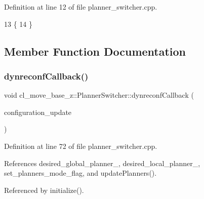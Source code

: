 Definition at line 12 of file planner\+\_\+switcher.\+cpp.


\begin{DoxyCode}
13 \{
14 \}
\end{DoxyCode}


\subsection{Member Function Documentation}
\mbox{\label{classcl__move__base__z_1_1PlannerSwitcher_ad9371bd8d62600ef874e8914c3ec177b}} 
\subsubsection{\texorpdfstring{dynreconf\+Callback()}{dynreconfCallback()}}
{\footnotesize\ttfamily void cl\+\_\+move\+\_\+base\+\_\+z\+::\+Planner\+Switcher\+::dynreconf\+Callback (\begin{DoxyParamCaption}\item[{const dynamic\+\_\+reconfigure\+::\+Config\+::\+Const\+Ptr \&}]{configuration\+\_\+update }\end{DoxyParamCaption})\hspace{0.3cm}{\ttfamily [private]}}



Definition at line 72 of file planner\+\_\+switcher.\+cpp.



References desired\+\_\+global\+\_\+planner\+\_\+, desired\+\_\+local\+\_\+planner\+\_\+, set\+\_\+planners\+\_\+mode\+\_\+flag, and update\+Planners().



Referenced by initialize().


